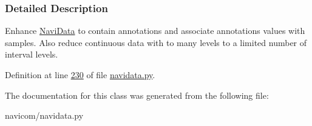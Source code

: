 \subsubsection{Detailed Description}
Enhance \hyperlink{classnavicom_1_1navidata_1_1NaviData}{NaviData} to contain annotations and associate annotations values with samples. Also reduce continuous data with to many levels to a limited number of interval levels. 

Definition at line \hyperlink{navidata_8py_source_l00230}{230} of file \hyperlink{navidata_8py_source}{navidata.py}.



The documentation for this class was generated from the following file:\begin{DoxyCompactItemize}
\item 
navicom/navidata.py\end{DoxyCompactItemize}
